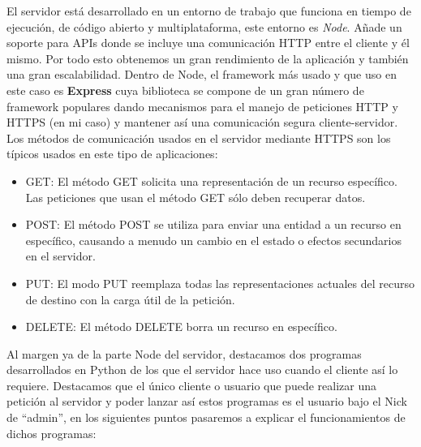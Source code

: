 \documentclass[a4paper, 12pt]{book}
\begin{document}
	El servidor está desarrollado en un entorno de trabajo que funciona en tiempo de ejecución, de código abierto y multiplataforma, este entorno es \textit{Node}. Añade un soporte para APIs donde se incluye una comunicación HTTP entre el cliente y él mismo. Por todo esto obtenemos un gran rendimiento de la aplicación y también una gran escalabilidad. Dentro de Node, el framework más usado y que uso en este caso es \textbf{Express} cuya biblioteca se compone de un gran número de framework populares dando mecanismos para el manejo de peticiones HTTP y HTTPS (en mi caso) y mantener así una comunicación segura cliente-servidor. 
	Los métodos de comunicación usados en el servidor mediante HTTPS son los típicos usados en este tipo de aplicaciones:
	\begin{itemize}
  	\item GET: El método GET  solicita una representación de un recurso específico. Las peticiones que usan el método GET sólo deben recuperar datos.
  	\item POST: El método POST se utiliza para enviar una entidad a un recurso en específico, causando a menudo un cambio en el estado o efectos secundarios en el servidor.
  	\item PUT: El modo PUT reemplaza todas las representaciones actuales del recurso de destino con la carga útil de la petición.
  	\item DELETE: El método DELETE borra un recurso en específico.
	\end{itemize}

Al margen ya de la parte Node del servidor, destacamos dos programas desarrollados en Python de los que el servidor hace uso cuando el cliente así lo requiere. Destacamos que el único cliente o usuario que puede realizar una petición al servidor y poder lanzar así estos programas es el usuario bajo el Nick de ``admin'', en los siguientes puntos pasaremos a explicar el funcionamientos de dichos programas:
\end{document}
